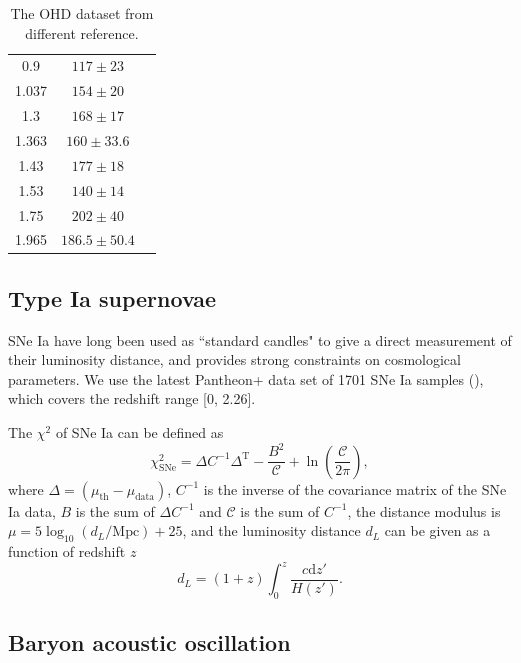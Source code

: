 \documentclass[twocolumn]{aastex631}
\begin{document}
\begin{table}
\begin{tabular}{ccl}
         0.9 & $117 \pm 23$ & \cite{PhysRevD.71.123001} \\
         1.037 & $154 \pm 20$ & \cite{M.Moresco_2012} \\
         1.3 & $168 \pm 17$ & \cite{PhysRevD.71.123001} \\
         1.363 & $160 \pm 33.6$ & \cite{10.1093/mnrasl/slv037} \\
         1.43 & $177 \pm 18$ & \cite{PhysRevD.71.123001} \\
         1.53 & $140 \pm 14$ & \cite{PhysRevD.71.123001} \\
         1.75 & $202 \pm 40$ & \cite{PhysRevD.71.123001} \\
         1.965 & $186.5 \pm 50.4$ & \cite{10.1093/mnrasl/slv037} \\
         \hline\hline    
      \end{tabular}
      \caption{
         The OHD dataset from different reference.
      }
      \label{tab:1}
   \end{table}

\subsection{Type Ia supernovae}

   SNe Ia have long been used as ``standard candles" to give a direct
   measurement of their luminosity distance, and provides strong constraints
   on cosmological parameters. We use the latest Pantheon+ data set of 1701 
   SNe Ia samples (\cite{Scolnic_2022}), which covers the redshift range [0, 2.26].
   
   The $\chi^2$ of SNe Ia can be defined as 
   \begin{equation}
      \chi_{\text{SNe}}^2=\Delta C^{-1} \Delta^{\text{T}}-\frac{B^2}{\mathcal{C}}+\ln\left(\frac{\mathcal{C}}{2\pi}\right),
      \label{eq:15}
   \end{equation}
   where $\Delta=(\mu_{\text{th}}-\mu_{\text{data}})$, $C^{-1}$ is the inverse of the
   covariance matrix of the SNe Ia data, $B$ is the sum of $\Delta C^{-1}$ and 
   $\mathcal{C}$ is the sum of $C^{-1}$, the distance modulus is 
   $\mu=5\log_{10}(d_L/\text{Mpc})+25$, and the luminosity distance $d_L$ 
   can be given as a function of redshift $z$
   \begin{equation}
      d_L=(1+z)\int_0^z\frac{c\mathrm{d}z'}{H(z')}.
      \label{eq:16}
   \end{equation}

\subsection{Baryon acoustic oscillation}
\end{document}
